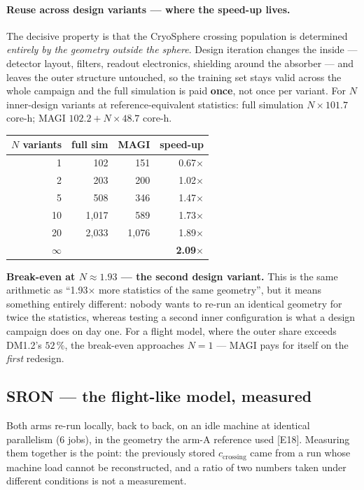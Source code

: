 \documentclass[11pt,a4paper]{article}
\newcommand{\ev}[1]{{\footnotesize\textcolor{prov}{[#1]}}}
\begin{document}
\paragraph{Reuse across design variants --- where the speed-up lives.}
The decisive property is that the CryoSphere crossing population is determined
\emph{entirely by the geometry outside the sphere}. Design iteration changes the
inside --- detector layout, filters, readout electronics, shielding around the
absorber --- and leaves the outer structure untouched, so the training set stays
valid across the whole campaign and the full simulation is paid \textbf{once},
not once per variant. For $N$ inner-design variants at reference-equivalent
statistics: full simulation $N \times 101.7$ core-h; MAGI
$102.2 + N \times 48.7$ core-h.

\begin{center}
\begin{tabular}{rrrr}
\toprule
$N$ variants & full sim & MAGI & speed-up \\
\midrule
1  & 102   & 151   & 0.67$\times$ \\
2  & 203   & 200   & 1.02$\times$ \\
5  & 508   & 346   & 1.47$\times$ \\
10 & 1{,}017 & 589 & 1.73$\times$ \\
20 & 2{,}033 & 1{,}076 & 1.89$\times$ \\
$\infty$ & & & \textbf{2.09$\times$} \\
\bottomrule
\end{tabular}
\end{center}

\textbf{Break-even at $N \approx 1.93$ --- the second design variant.} This is
the same arithmetic as ``1.93$\times$ more statistics of the same geometry'',
but it means something entirely different: nobody wants to re-run an identical
geometry for twice the statistics, whereas testing a second inner configuration
is what a design campaign does on day one. For a flight model, where the outer
share exceeds DM1.2's $52\,\%$, the break-even approaches $N=1$ --- MAGI pays
for itself on the \emph{first} redesign.

\subsection{SRON --- the flight-like model, measured}
\label{sec:cost-sron}

Both arms re-run locally, back to back, on an idle machine at identical
parallelism (6 jobs), in the geometry the arm-A reference used
\ev{E18}. Measuring them together is the point: the previously stored
$c_{\mathrm{crossing}}$ came from a run whose machine load cannot be
reconstructed, and a ratio of two numbers taken under different conditions is
not a measurement.
\end{document}
